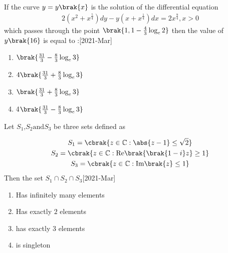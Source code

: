    \item If the curve $y = y\brak{x}$ is the solution of the differential equation 
          \begin{align}
           2(x^2 + x^{\frac{5}{4}}) dy - y(x + x^{\frac{1}{4}}) dx = 2 x^{\frac{9}{4}}, x>0
           \end{align}
	   which passes through the point $\brak{1 ,1 - \frac{4}{3} \log_e 2}$ then the value of $y\brak{16}$ is equal to :\hfill[2021-Mar]
          \begin{multicols}{2}
              \begin{enumerate}
                  \item $\brak{\frac{31}{3}- \frac{8}{3}\log_e 3}$\\
                   \item $4\brak{\frac{31}{3}+\frac{8}{3}\log_e 3}$
                    \item $\brak{\frac{31}{3}+ \frac{8}{3}\log_e 3}$\\
                     \item 4$\brak{\frac{31}{3}- \frac{8}{3}\log_e 3}$
              \end{enumerate}
          \end{multicols}
          \item Let $S_1 \text{,} S_2 \text{and} S_3$ be three sets defined as
          
\begin{gather*}
	S_1 = \cbrak{z \in \mathbb C: \abs{z-1} \leq \sqrt{2} } \\
	S_2 = \cbrak{z \in \mathbb C: \mathrm{Re}\brak{\brak{1-i}z} \geq 1 } \\
	S_3 = \cbrak{z \in \mathbb C: \mathrm{Im}\brak{ z} \leq 1}
\end{gather*}
Then the set $S_1 \cap S_2 \cap S_3$\hfill[2021-Mar]

\begin{enumerate}
    \item Has infinitely many elements
    \item Has exactly $2$ elements
    \item has exactly $3$ elements 
    \item is singleton
\end{enumerate}

